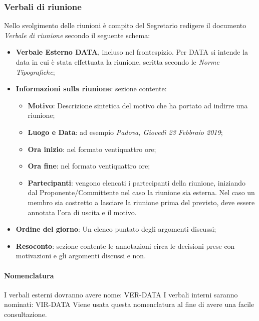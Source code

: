                 \subsubsection{Verbali di riunione}
                   Nello svolgimento delle riunioni è compito del Segretario redigere il documento \textit{Verbale di riunione} secondo il seguente schema:
                    \begin{itemize}
                        \item \textbf{Verbale Esterno DATA}, incluso nel frontespizio. Per DATA si intende la data in cui è stata effettuata la riunione, scritta secondo le \textit{Norme Tipografiche};
                        \item \textbf{Informazioni sulla riunione}: sezione contente:
                        \begin{itemize}
                            \item \textbf{Motivo}: Descrizione sintetica del motivo che ha portato ad indirre una riunione;
                            \item \textbf{Luogo e Data}: ad esempio \textit{Padova, Giovedì 23 Febbraio 2019}; 
                            \item \textbf{Ora inizio}: nel formato ventiquattro ore;
                            \item \textbf{Ora fine}: nel formato ventiquattro ore;
                            \item \textbf{Partecipanti}: vengono elencati i partecipanti della riunione, iniziando dal Proponente/Committente nel caso la riunione sia esterna. Nel caso un membro sia costretto a lasciare la riunione prima del previsto, deve essere annotata l'ora di uscita e il motivo.
                        \end{itemize}
                        \item \textbf{Ordine del giorno}: Un elenco puntato degli argomenti discussi; 
                        \item \textbf{Resoconto}: sezione contente le annotazioni circa le decisioni prese con motivazioni e gli argomenti discussi e non.
                    \end{itemize}
                    \paragraph{Nomenclatura} 
                        I verbali esterni dovranno avere nome:
                        VER-DATA
                        \newline
                        I verbali interni saranno nominati:
                        VIR-DATA
                        \newline
                        Viene usata questa nomenclatura al fine di avere una facile consultazione.
                        \newline
